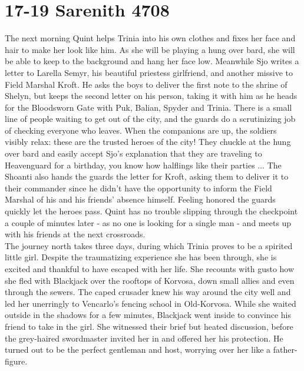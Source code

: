 \section{17-19 Sarenith 4708}

The next morning Quint helps Trinia into his own clothes and fixes her face and hair to make her look like him. As she will be playing a hung over bard, she will be able to keep to the background and hang her face low. Meanwhile Sjo writes a letter to Larella Semyr, his beautiful priestess girlfriend, and another missive to Field Marshal Kroft. He asks the boys to deliver the first note to the shrine of Shelyn, but keeps the second letter on his person, taking it with him as he heads for the Bloodsworn Gate with Puk, Balian, Spyder and Trinia. There is a small line of people waiting to get out of the city, and the guards do a scrutinizing job of checking everyone who leaves. When the companions are up, the soldiers visibly relax: these are the trusted heroes of the city! They chuckle at the hung over bard and easily accept Sjo's explanation that they are traveling to Heavenguard for a birthday, you know how halflings like their parties ... The Shoanti also hands the guards the letter for Kroft, asking them to deliver it to their commander since he didn't have the opportunity to inform the Field Marshal of his and his friends' absence himself. Feeling honored the guards quickly let the heroes pass. Quint has no trouble slipping through the checkpoint a couple of minutes later - as no one is looking for a single man - and meets up with his friends at the next crossroads.\\

The journey north takes three days, during which Trinia proves to be a spirited little girl. Despite the traumatizing experience she has been through, she is excited and thankful to have escaped with her life. She recounts with gusto how she fled with Blackjack over the rooftops of Korvosa, down small allies and even through the sewers. The caped crusader knew his way around the city well and led her unerringly to Vencarlo's fencing school in Old-Korvosa. While she waited outside in the shadows for a few minutes, Blackjack went inside to convince his friend to take in the girl. She witnessed their brief but heated discussion, before the grey-haired swordmaster invited her in and offered her his protection. He turned out to be the perfect gentleman and host, worrying over her like a father-figure.\\

